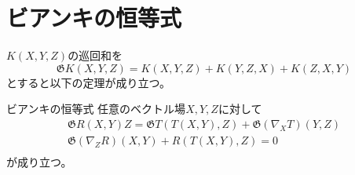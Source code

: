\section{ビアンキの恒等式}
	$K(X, Y, Z)$の巡回和を
		\[\mathfrak{G}{K(X, Y, Z)} = K(X, Y, Z) + K(Y, Z, X) + K(Z, X, Y)\]
	とすると以下の定理が成り立つ。
	\begin{thm}{ビアンキの恒等式}
		任意のベクトル場$X, Y, Z$に対して
		\begin{gather*}
			\mathfrak{G}{R(X, Y)Z} = \mathfrak{G}{T(T(X, Y), Z)} + \mathfrak{G}{(\nabla_XT)(Y, Z)}\\
			\mathfrak{G}{(\nabla_ZR)(X, Y) + R(T(X, Y), Z)} = 0\\
		\end{gather*}
		が成り立つ。
	\end{thm}


